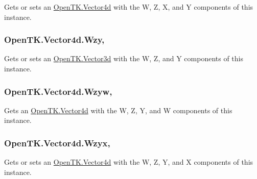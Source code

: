 Gets or sets an \hyperlink{struct_open_t_k_1_1_vector4d}{Open\-T\-K.\-Vector4d} with the W, Z, X, and Y components of this instance. 

\hypertarget{struct_open_t_k_1_1_vector4d_a3bac109c103b2c6a92b3af68286f8356}{
\subsubsection[{Wzy}]{ Open\-T\-K.\-Vector4d.\-Wzy\hspace{0.3cm}{\ttfamily [get]}, {\ttfamily [set]}}}\label{struct_open_t_k_1_1_vector4d_a3bac109c103b2c6a92b3af68286f8356}


Gets or sets an \hyperlink{struct_open_t_k_1_1_vector3d}{Open\-T\-K.\-Vector3d} with the W, Z, and Y components of this instance. 

\hypertarget{struct_open_t_k_1_1_vector4d_a5304a9a1f46ac413b7ebf9098d6887f0}{
\subsubsection[{Wzyw}]{ Open\-T\-K.\-Vector4d.\-Wzyw\hspace{0.3cm}{\ttfamily [get]}, {\ttfamily [set]}}}\label{struct_open_t_k_1_1_vector4d_a5304a9a1f46ac413b7ebf9098d6887f0}


Gets an \hyperlink{struct_open_t_k_1_1_vector4d}{Open\-T\-K.\-Vector4d} with the W, Z, Y, and W components of this instance. 

\hypertarget{struct_open_t_k_1_1_vector4d_a040aeb8d48f4501897162c83532fb64a}{
\subsubsection[{Wzyx}]{ Open\-T\-K.\-Vector4d.\-Wzyx\hspace{0.3cm}{\ttfamily [get]}, {\ttfamily [set]}}}\label{struct_open_t_k_1_1_vector4d_a040aeb8d48f4501897162c83532fb64a}


Gets or sets an \hyperlink{struct_open_t_k_1_1_vector4d}{Open\-T\-K.\-Vector4d} with the W, Z, Y, and X components of this instance. 

